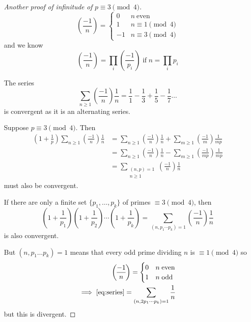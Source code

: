 \documentclass{article}
\newcommand{\legendre}[2]{\genfrac{(}{)}{}{}{#1}{#2}}
\begin{document}
\begin{proof}[Another proof of infinitude of $p \equiv 3 \pmod{4}$]
    \begin{equation*}
        \legendre{-1}{n} =
        \begin{cases}
            0 & n \ \text{even} \\
            1 & n \equiv 1 \pmod{4} \\
            -1 & n \equiv 3 \pmod{4}
        \end{cases}
    \end{equation*}
    and we know
    \begin{equation*}
        \legendre{-1}{n} = \prod_i \legendre{-1}{p_i} \; \text{if} \; n = \prod_i p_i
    \end{equation*}

    The series
    \begin{equation*}
        \sum_{n \geq 1} \legendre{-1}{n} \frac{1}{n} = \frac{1}{1} - \frac{1}{3} + \frac{1}{5} - \frac{1}{7} \dots
    \end{equation*}
    is convergent as it is an alternating series.

    Suppose $p \equiv 3 \pmod{4}$. Then
    \begin{align*}
        \left(1 + \frac{1}{p}\right) \sum_{n \geq 1} \legendre{-1}{n} \frac{1}{n}
        &= \sum_{n \geq 1} \legendre{-1}{n} \frac{1}{n} + \sum_{m \geq 1} \legendre{-1}{m} \frac{1}{mp} \\
        &= \sum_{n \geq 1} \legendre{-1}{n} \frac{1}{n} - \sum_{m \geq 1} \legendre{-1}{mp} \frac{1}{mp} \\
        &= \sum_{\substack{(n, p) = 1 \\ n \geq 1}} \legendre{-1}{n} \frac{1}{n}
    \end{align*}
    must also be convergent.

    If there are only a finite set $\{p_1, \dotsc, p_k\}$ of primes $\equiv 3 \pmod{4}$, then
    \begin{equation}\label{eq:series}
        \left(1 + \frac{1}{p_1}\right) \left(1 + \frac{1}{p_2}\right) \dotsm \left(1 + \frac{1}{p_k}\right) = \sum_{(n, p_1 \dotsm p_k)=1} \legendre{-1}{n} \frac{1}{n} \tag{$*$}
    \end{equation}
    is also convergent.

    But $(n, p_1 \dots p_k) = 1$ means that every odd prime dividing $n$ is $\equiv 1 \pmod{4}$ so
    \begin{align*}
        \legendre{-1}{n} =
        \begin{cases}
            0 & n \; \text{even} \\
            1 & n \; \text{odd}
        \end{cases} \\
        \implies \text{\eqref{eq:series}} = \sum_{(n, 2p_1 \dotsm p_k) = 1} \frac{1}{n}
    \end{align*}
    but this is divergent.
\end{proof}
\end{document}
